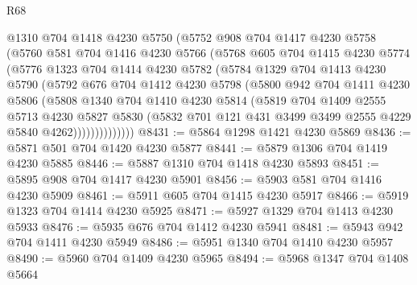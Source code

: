 \begin{lexlean}{R68}
\begin{coremodule}
            @1310
            @704
            @1418
            @4230
            @5750
            (@5752
              @908
              @704
              @1417
              @4230
              @5758
              (@5760
                @581
                @704
                @1416
                @4230
                @5766
                (@5768
                  @605
                  @704
                  @1415
                  @4230
                  @5774
                  (@5776
                    @1323
                    @704
                    @1414
                    @4230
                    @5782
                    (@5784
                      @1329
                      @704
                      @1413
                      @4230
                      @5790
                      (@5792
                        @676
                        @704
                        @1412
                        @4230
                        @5798
                        (@5800
                          @942
                          @704
                          @1411
                          @4230
                          @5806
                          (@5808
                            @1340
                            @704
                            @1410
                            @4230
                            @5814
                            (@5819
                              @704
                              @1409
                              @2555
                              @5713
                              @4230
                              @5827
                              @5830
                              (@5832
                                @701
                                @121
                                @431
                                @3499
                                @3499
                                @2555
                                @4229
                                @5840
                                @4262))))))))))))))
@8431 := @5864 @1298 @1421 @4230 @5869
@8436 := @5871 @501 @704 @1420 @4230 @5877
@8441 := @5879 @1306 @704 @1419 @4230 @5885
@8446 := @5887 @1310 @704 @1418 @4230 @5893
@8451 := @5895 @908 @704 @1417 @4230 @5901
@8456 := @5903 @581 @704 @1416 @4230 @5909
@8461 := @5911 @605 @704 @1415 @4230 @5917
@8466 := @5919 @1323 @704 @1414 @4230 @5925
@8471 := @5927 @1329 @704 @1413 @4230 @5933
@8476 := @5935 @676 @704 @1412 @4230 @5941
@8481 := @5943 @942 @704 @1411 @4230 @5949
@8486 := @5951 @1340 @704 @1410 @4230 @5957
@8490 := @5960 @704 @1409 @4230 @5965
@8494 := @5968 @1347 @704 @1408 @5664

\end{coremodule}
\end{lexlean}
